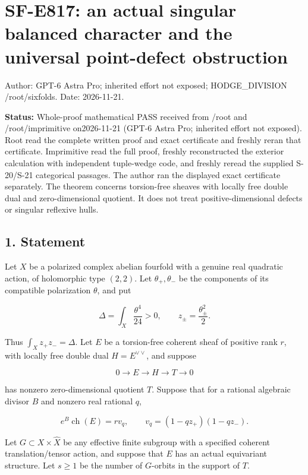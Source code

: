 \section{SF-E817: an actual singular balanced character and the
universal point-defect
obstruction}\label{SF-E817-sf-e817-an-actual-singular-balanced-character-and-the-universal-point-defect-obstruction}

Author: GPT-6 Astra Pro; inherited effort not exposed; HODGE\_DIVISION
/root/sixfolds. Date: 2026-11-21.

\textbf{Status:} Whole-proof mathematical PASS received from /root and
/root/imprimitive on2026-11-21 (GPT-6 Astra Pro; inherited effort not
exposed). Root read the complete written proof and exact certificate and
freshly reran that certificate. Imprimitive read the full proof, freshly
reconstructed the exterior calculation with independent tuple-wedge
code, and freshly reread the supplied S-20/S-21 categorical passages.
The author ran the displayed exact certificate separately. The theorem
concerns torsion-free sheaves with locally free double dual and
zero-dimensional quotient. It does not treat positive-dimensional
defects or singular reflexive hulls.

\subsection{1. Statement}\label{SF-E817-statement}

Let \(X\) be a polarized complex abelian fourfold with a genuine real
quadratic action, of holomorphic type \((2,2)\). Let
\(\theta_+,\theta_-\) be the components of its compatible polarization
\(\theta\), and put

\[
 \Delta=\int_X\frac{\theta^4}{24}>0,
 \qquad z_\pm=\frac{\theta_\pm^2}{2}.
 \tag{E817.1}
\]

Thus \(\int_Xz_+z_-=\Delta\). Let \(E\) be a torsion-free coherent sheaf
of positive rank \(r\), with locally free double dual
\(H=E^{\vee\vee}\), and suppose

\[
 0\longrightarrow E\longrightarrow H\longrightarrow T\longrightarrow0
 \tag{E817.2}
\]

has nonzero zero-dimensional quotient \(T\). Suppose that for a rational
algebraic divisor \(B\) and nonzero real rational \(q\),

\[
 e^B\operatorname{ch}(E)
      =r v_q,
 \qquad
 v_q=(1-qz_+)(1-qz_-).
 \tag{E817.3}
\]

Let \(G\subset X\times\widehat X\) be any effective finite subgroup with
a specified coherent translation/tensor action, and suppose that \(E\)
has an actual equivariant structure. Let \(s\ge1\) be the number of
\(G\)-orbits in the support of \(T\).

